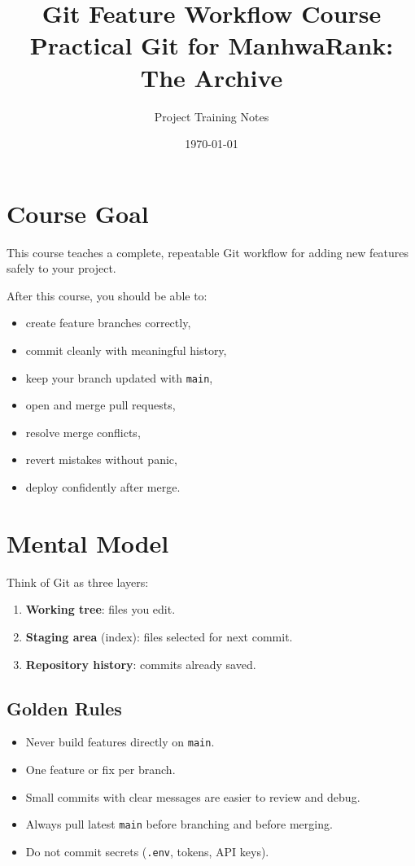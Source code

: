 \documentclass[11pt,a4paper]{article}
\title{Git Feature Workflow Course \\ \large Practical Git for ManhwaRank: The Archive}
\author{Project Training Notes}
\date{\today}
\begin{document}
\maketitle
\tableofcontents
\newpage

\section{Course Goal}
This course teaches a complete, repeatable Git workflow for adding new features safely to your project.

After this course, you should be able to:
\begin{itemize}[leftmargin=1.5em]
  \item create feature branches correctly,
  \item commit cleanly with meaningful history,
  \item keep your branch updated with \texttt{main},
  \item open and merge pull requests,
  \item resolve merge conflicts,
  \item revert mistakes without panic,
  \item deploy confidently after merge.
\end{itemize}

\section{Mental Model}
Think of Git as three layers:
\begin{enumerate}[leftmargin=1.5em]
  \item \textbf{Working tree}: files you edit.
  \item \textbf{Staging area} (index): files selected for next commit.
  \item \textbf{Repository history}: commits already saved.
\end{enumerate}

\subsection{Golden Rules}
\begin{itemize}[leftmargin=1.5em]
  \item Never build features directly on \texttt{main}.
  \item One feature or fix per branch.
  \item Small commits with clear messages are easier to review and debug.
  \item Always pull latest \texttt{main} before branching and before merging.
  \item Do not commit secrets (\texttt{.env}, tokens, API keys).
\end{itemize}
\end{document}
